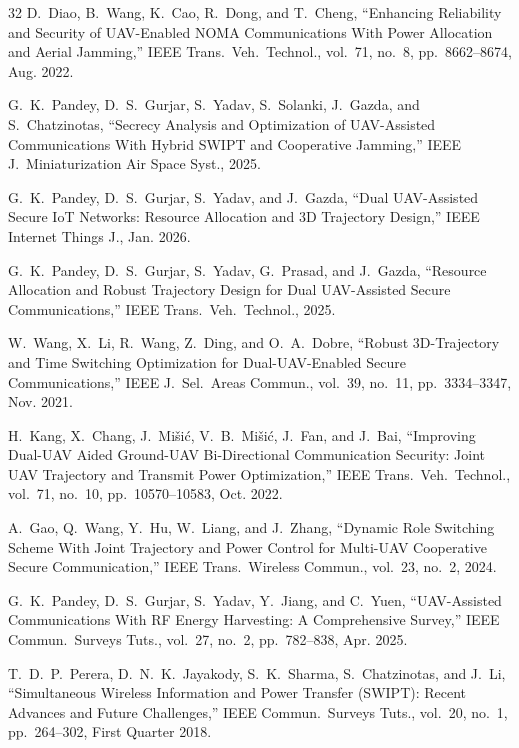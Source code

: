 \documentclass[journal]{IEEEtran}
\begin{document}
\begin{thebibliography}{32}
D.~Diao, B.~Wang, K.~Cao, R.~Dong, and T.~Cheng,
``Enhancing Reliability and Security of UAV-Enabled NOMA Communications With Power Allocation and Aerial Jamming,''
IEEE Trans.\ Veh.\ Technol., vol.~71, no.~8, pp.~8662--8674, Aug. 2022.

G.~K.~Pandey, D.~S.~Gurjar, S.~Yadav, S.~Solanki, J.~Gazda, and S.~Chatzinotas,
``Secrecy Analysis and Optimization of UAV-Assisted Communications With Hybrid SWIPT and Cooperative Jamming,''
IEEE J.\ Miniaturization Air Space Syst., 2025.

G.~K.~Pandey, D.~S.~Gurjar, S.~Yadav, and J.~Gazda,
``Dual UAV-Assisted Secure IoT Networks: Resource Allocation and 3D Trajectory Design,''
IEEE Internet Things J., Jan. 2026.

G.~K.~Pandey, D.~S.~Gurjar, S.~Yadav, G.~Prasad, and J.~Gazda,
``Resource Allocation and Robust Trajectory Design for Dual UAV-Assisted Secure Communications,''
IEEE Trans.\ Veh.\ Technol., 2025.

W.~Wang, X.~Li, R.~Wang, Z.~Ding, and O.~A.~Dobre,
``Robust 3D-Trajectory and Time Switching Optimization for Dual-UAV-Enabled Secure Communications,''
IEEE J.\ Sel.\ Areas Commun., vol.~39, no.~11, pp.~3334--3347, Nov. 2021.

H.~Kang, X.~Chang, J.~Mi\v{s}i\'{c}, V.~B.~Mi\v{s}i\'{c}, J.~Fan, and J.~Bai,
``Improving Dual-UAV Aided Ground-UAV Bi-Directional Communication Security: Joint UAV Trajectory and Transmit Power Optimization,''
IEEE Trans.\ Veh.\ Technol., vol.~71, no.~10, pp.~10570--10583, Oct. 2022.

A.~Gao, Q.~Wang, Y.~Hu, W.~Liang, and J.~Zhang,
``Dynamic Role Switching Scheme With Joint Trajectory and Power Control for Multi-UAV Cooperative Secure Communication,''
IEEE Trans.\ Wireless Commun., vol.~23, no.~2, 2024.

G.~K.~Pandey, D.~S.~Gurjar, S.~Yadav, Y.~Jiang, and C.~Yuen,
``UAV-Assisted Communications With RF Energy Harvesting: A Comprehensive Survey,''
IEEE Commun.\ Surveys Tuts., vol.~27, no.~2, pp.~782--838, Apr. 2025.

T.~D.~P.~Perera, D.~N.~K.~Jayakody, S.~K.~Sharma, S.~Chatzinotas, and J.~Li,
``Simultaneous Wireless Information and Power Transfer (SWIPT): Recent Advances and Future Challenges,''
IEEE Commun.\ Surveys Tuts., vol.~20, no.~1, pp.~264--302, First Quarter 2018.


\end{thebibliography}
\end{document}
